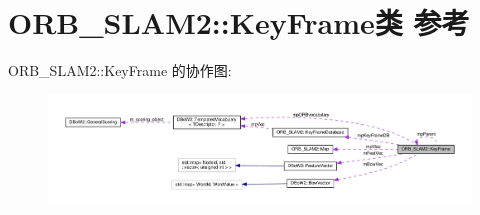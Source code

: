 \hypertarget{classORB__SLAM2_1_1KeyFrame}{\section{O\-R\-B\-\_\-\-S\-L\-A\-M2\-:\-:Key\-Frame类 参考}
\label{classORB__SLAM2_1_1KeyFrame}
}


O\-R\-B\-\_\-\-S\-L\-A\-M2\-:\-:Key\-Frame 的协作图\-:
\nopagebreak
\begin{figure}[H]
\begin{center}
\leavevmode
\includegraphics[width=350pt]{classORB__SLAM2_1_1KeyFrame__coll__graph}
\end{center}
\end{figure}
